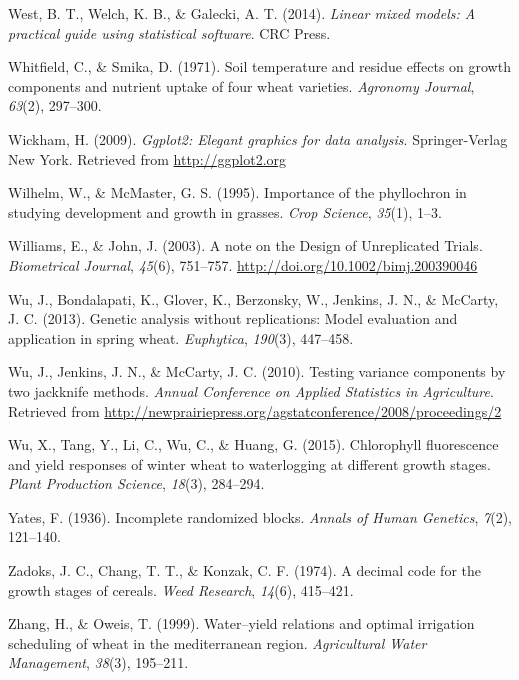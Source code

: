 \documentclass[12pt,oneside]{dukestatscithesis} %
\theoremstyle{definition}
\theoremstyle{definition}
\theoremstyle{definition}
\theoremstyle{remark}
\begin{document}
\hypertarget{ref-west2014linear}{}
West, B. T., Welch, K. B., \& Galecki, A. T. (2014). \emph{Linear mixed
models: A practical guide using statistical software}. CRC Press.

\hypertarget{ref-whitfield1971soil}{}
Whitfield, C., \& Smika, D. (1971). Soil temperature and residue effects
on growth components and nutrient uptake of four wheat varieties.
\emph{Agronomy Journal}, \emph{63}(2), 297--300.

\hypertarget{ref-hadley2009}{}
Wickham, H. (2009). \emph{Ggplot2: Elegant graphics for data analysis}.
Springer-Verlag New York. Retrieved from \url{http://ggplot2.org}

\hypertarget{ref-wilhelm1995importance}{}
Wilhelm, W., \& McMaster, G. S. (1995). Importance of the phyllochron in
studying development and growth in grasses. \emph{Crop Science},
\emph{35}(1), 1--3.

\hypertarget{ref-williams_note_2003}{}
Williams, E., \& John, J. (2003). A note on the Design of Unreplicated
Trials. \emph{Biometrical Journal}, \emph{45}(6), 751--757.
\url{http://doi.org/10.1002/bimj.200390046}

\hypertarget{ref-wu2013}{}
Wu, J., Bondalapati, K., Glover, K., Berzonsky, W., Jenkins, J. N., \&
McCarty, J. C. (2013). Genetic analysis without replications: Model
evaluation and application in spring wheat. \emph{Euphytica},
\emph{190}(3), 447--458.

\hypertarget{ref-wu2010}{}
Wu, J., Jenkins, J. N., \& McCarty, J. C. (2010). Testing variance
components by two jackknife methods. \emph{Annual Conference on Applied
Statistics in Agriculture}. Retrieved from
\url{http://newprairiepress.org/agstatconference/2008/proceedings/2}

\hypertarget{ref-wu2015chlorophyll}{}
Wu, X., Tang, Y., Li, C., Wu, C., \& Huang, G. (2015). Chlorophyll
fluorescence and yield responses of winter wheat to waterlogging at
different growth stages. \emph{Plant Production Science}, \emph{18}(3),
284--294.

\hypertarget{ref-yates1936incomplete}{}
Yates, F. (1936). Incomplete randomized blocks. \emph{Annals of Human
Genetics}, \emph{7}(2), 121--140.

\hypertarget{ref-zadoks1974decimal}{}
Zadoks, J. C., Chang, T. T., \& Konzak, C. F. (1974). A decimal code for
the growth stages of cereals. \emph{Weed Research}, \emph{14}(6),
415--421.

\hypertarget{ref-zhang1999water}{}
Zhang, H., \& Oweis, T. (1999). Water--yield relations and optimal
irrigation scheduling of wheat in the mediterranean region.
\emph{Agricultural Water Management}, \emph{38}(3), 195--211.
\end{document}
